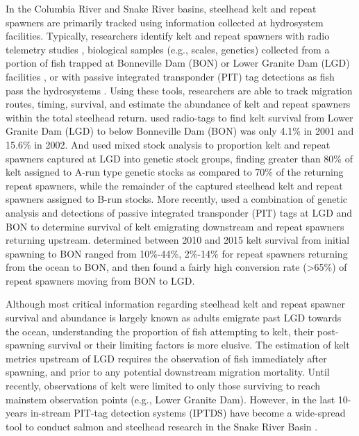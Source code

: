 \documentclass[11pt,a4paper,]{article}
\begin{document}
In the Columbia River and Snake River basins, steelhead kelt and repeat spawners are primarily tracked using information collected at hydrosystem facilities. Typically, researchers identify kelt and repeat spawners with radio telemetry studies \autocite{wertheimerDownstreamPassageSteelhead2005}, biological samples (e.g., scales, genetics) collected from a portion of fish trapped at Bonneville Dam (BON) or Lower Granite Dam (LGD) facilities \autocite{copelandPatternsIteroparityWild2019,matalaWhatGoesDoes2016,lawryWildAdultSteelhead2020,hessDifferentialAdultMigrationtiming2016}, or with passive integrated transponder (PIT) tag detections as fish pass the hydrosystems \autocite{copelandPatternsIteroparityWild2019,keeferIteroparityColumbiaRiver2008}. Using these tools, researchers are able to track migration routes, timing, survival, and estimate the abundance of kelt and repeat spawners within the total steelhead return. \textcite{wertheimerDownstreamPassageSteelhead2005} used radio-tags to find kelt survival from Lower Granite Dam (LGD) to below Bonneville Dam (BON) was only 4.1\% in 2001 and 15.6\% in 2002. And \textcite{matalaWhatGoesDoes2016} used mixed stock analysis to proportion kelt and repeat spawners captured at LGD into genetic stock groups, finding greater than 80\% of kelt assigned to A-run type genetic stocks as compared to 70\% of the returning repeat spawners, while the remainder of the captured steelhead kelt and repeat spawners assigned to B-run stocks. More recently, \textcite{copelandPatternsIteroparityWild2019} used a combination of genetic analysis and detections of passive integrated transponder (PIT) tags at LGD and BON to determine survival of kelt emigrating downstream and repeat spawners returning upstream. \textcite{copelandPatternsIteroparityWild2019} determined between 2010 and 2015 kelt survival from initial spawning to BON ranged from 10\%-44\%, 2\%-14\% for repeat spawners returning from the ocean to BON, and then found a fairly high conversion rate (\textgreater65\%) of repeat spawners moving from BON to LGD.

Although most critical information regarding steelhead kelt and repeat spawner survival and abundance is largely known as adults emigrate past LGD towards the ocean, understanding the proportion of fish attempting to kelt, their post-spawning survival or their limiting factors is more elusive. The estimation of kelt metrics upstream of LGD requires the observation of fish immediately after spawning, and prior to any potential downstream migration mortality. Until recently, observations of kelt were limited to only those surviving to reach mainstem observation points (e.g., Lower Granite Dam). However, in the last 10-years in-stream PIT-tag detection systems (IPTDS) have become a wide-spread tool to conduct salmon and steelhead research in the Snake River Basin \autocite{kinzerSnakeRiverBasin2020,dobosUnderstandingLifeHistory2020,briana.knothIDAHOADULTSTEELHEAD2018}.
\end{document}
